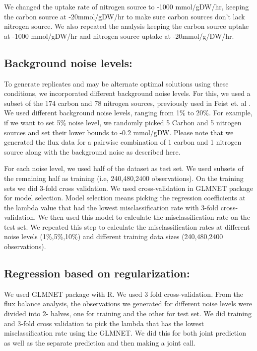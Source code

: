 \documentclass[12pt]{article}
\begin{document}
We changed the uptake rate of nitrogen source to -1000 mmol/gDW/hr, keeping the carbon source at -20mmol/gDW/hr to make sure carbon sources don't lack nitrogen source. We also repeated the analysis keeping the carbon source uptake at -1000 mmol/gDW/hr and nitrogen source uptake at -20mmol/g/DW/hr. 

\subsection*{Background noise levels:} 
To generate replicates and may be alternate optimal solutions using these conditions, we incorporated different background noise levels. For this, we used a subset of the 174 carbon and 78 nitrogen sources, previously used in Feist et. al \cite{Feistetal2007}.  We used different background noise levels, ranging from 1\% to 20\%. For example, if we want to set 5\% noise level, we randomly picked 5 Carbon and 5 nitrogen sources and set their lower bounds to -0.2 mmol/gDW. Please note that we generated the flux data for a pairwise combination of 1 carbon and 1 nitrogen source along with the background noise as described here. 

For each noise level, we used half of the dataset as test set. We used subsets of the remaining half as training (i.e, 240,480,2400 observations). On the training sets we did 3-fold cross validation. We used cross-validation in GLMNET package for model selection. Model selection means picking the regression coefficients at the lambda value that had the lowest misclassification rate with 3-fold cross-validation. We then used this model to calculate the misclassification rate on the test set. We repeated this step to calculate the misclassification rates at different noise levels (1\%,5\%,10\%) and different training data sizes (240,480,2400 observations).

\subsection*{Regression based on regularization:} 
We used GLMNET package with R. We used 3 fold cross-validation. From the flux balance analysis, the observations we generated for different noise levels were divided into 2- halves, one for training and the other for test set. We did training and 3-fold cross validation to pick the lambda that has the lowest misclassification rate using the GLMNET. We did this for both joint prediction as well as the separate prediction and then making a joint call.
\end{document}
